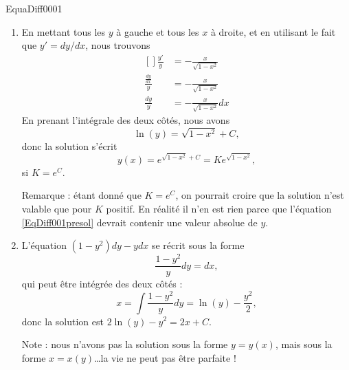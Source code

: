 \begin{corrige}{EquaDiff0001}

\begin{enumerate}

\item
En mettant tous les $y$ à gauche et tous les $x$ à droite, et en utilisant le fait que $y'=dy/dx$, nous trouvons
\begin{equation}
	\begin{aligned}[]
		\frac{ y' }{ y }&=-\frac{ x }{ \sqrt{1-x^2} }\\
		\frac{ \frac{ dy }{ dx } }{ y }&=-\frac{ x }{ \sqrt{1-x^2} }\\
		\frac{ dy }{ y }&=-\frac{ x }{ \sqrt{1-x^2} }dx
	\end{aligned}
\end{equation}
En prenant l'intégrale des deux côtés, nous avons
\begin{equation}		\label{EqDiff001presol}
	\ln(y)=\sqrt{1-x^2}+C,
\end{equation}
donc la solution s'écrit
\begin{equation}
	y(x)= e^{\sqrt{1-x^2}+C}=K e^{\sqrt{1-x^2}},
\end{equation}
si $K=e^C$.

Remarque : étant donné que $K=e^C$, on pourrait croire que la solution n'est valable que pour $K$ positif. En réalité il n'en est rien parce que l'équation \eqref{EqDiff001presol} devrait contenir une valeur absolue de $y$.

\item
L'équation $(1-y^2)dy-ydx$ se récrit sous la forme 
\begin{equation}
	\frac{ 1-y^2 }{ y }dy=dx,
\end{equation}
qui peut être intégrée des deux côtés :
\begin{equation}
	x=\int \frac{ 1-y^2 }{ y }dy=\ln(y)-\frac{ y^2 }{2},
\end{equation}
donc la solution est $2\ln(y)-y^2=2x+C$. 

Note : nous n'avons pas la solution sous la forme $y=y(x)$, mais sous la forme $x=x(y)$\ldots la vie ne peut pas être parfaite !

\end{enumerate}

\end{corrige}
